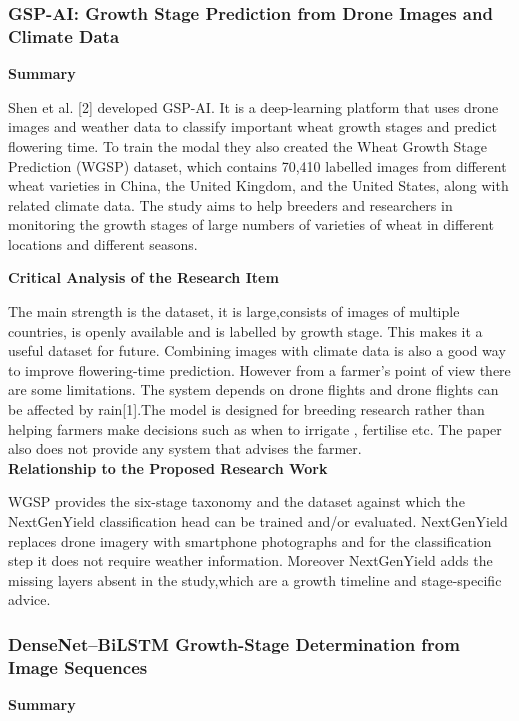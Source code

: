 \documentclass{FastFyp}
\begin{document}
\subsubsection{GSP-AI: Growth Stage Prediction from Drone Images and Climate Data}

\textbf{Summary}

Shen et al. [2] developed GSP-AI. It is a deep-learning platform that uses drone images and weather  data to classify important wheat growth stages and predict flowering time. To train the modal they also created the Wheat Growth Stage Prediction (WGSP) dataset, which contains 70,410 labelled images from different wheat varieties in China, the United Kingdom, and the United States, along with related climate data. The study aims to help breeders and researchers in monitoring the growth stages of large numbers of varieties of wheat in different locations and different seasons.

\textbf{Critical Analysis of the Research Item}

The main strength is the dataset, it is large,consists of images of multiple countries, is openly available and is labelled by growth stage. This makes it a useful dataset for future. Combining images with climate data is also a good way to improve flowering-time prediction. However from a farmer’s point of view there are some limitations. The system depends on drone flights and drone flights can be affected by rain[1].The model is designed for breeding research rather than helping farmers make decisions such as when to irrigate , fertilise etc. The paper also does not provide any system that advises the farmer.\\


\textbf{Relationship to the Proposed Research Work}

WGSP provides the six-stage taxonomy and the dataset against which the NextGenYield classification head can be trained and/or evaluated. NextGenYield replaces drone imagery with smartphone photographs and for the classification step it does not require weather information. Moreover NextGenYield adds the missing layers absent in the study,which are a growth timeline and stage-specific advice.

\subsubsection{DenseNet--BiLSTM Growth-Stage Determination from Image Sequences}

\textbf{Summary}
\end{document}
